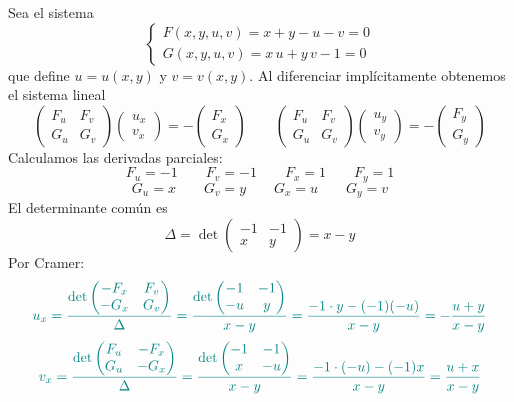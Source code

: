 \documentclass{article}
\begin{document}
Sea el sistema
\[
\begin{cases}
F(x,y,u,v) = x + y - u - v = 0\\[4pt]
G(x,y,u,v) = x\,u + y\,v - 1 = 0
\end{cases}
\]
que define \(u = u(x,y)\) y \(v = v(x,y)\). Al diferenciar implícitamente obtenemos el sistema lineal
\[
\begin{pmatrix}
F_u & F_v\\
G_u & G_v
\end{pmatrix}
\begin{pmatrix}
u_x\\
v_x
\end{pmatrix}
=
-
\begin{pmatrix}
F_x\\
G_x
\end{pmatrix}
\qquad
\begin{pmatrix}
F_u & F_v\\
G_u & G_v
\end{pmatrix}
\begin{pmatrix}
u_y\\
v_y
\end{pmatrix}
=
-
\begin{pmatrix}
F_y\\
G_y
\end{pmatrix}
\]
Calculamos las derivadas parciales:
\[
F_u = -1
\qquad
F_v = -1
\qquad
F_x = 1
\qquad
F_y = 1
\]
\[
G_u = x
\qquad
G_v = y
\qquad
G_x = u
\qquad
G_y = v
\]
El determinante común es
\[
\Delta
= \det
\begin{pmatrix}
-1 & -1\\
x  & y
\end{pmatrix}
= x - y
\]
Por Cramer:
\[
\color{teal}
u_x
=\frac{\det\begin{pmatrix} -F_x & F_v\\ -G_x & G_v \end{pmatrix}}{\Delta}
=\frac{\det\begin{pmatrix} -1 & -1\\ -u & y \end{pmatrix}}{x-y}
=\frac{-1\cdot y -(-1)(-u)}{x-y}
=-\frac{u+y}{x-y}
\]
\[
\color{teal}
v_x
=\frac{\det\begin{pmatrix} F_u & -F_x\\ G_u & -G_x \end{pmatrix}}{\Delta}
=\frac{\det\begin{pmatrix} -1 & -1\\ x & -u \end{pmatrix}}{x-y}
=\frac{-1\cdot(-u)-(-1)x}{x-y}
=\frac{u+x}{x-y}
\]
\end{document}

